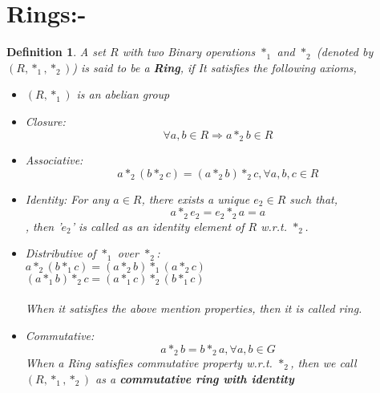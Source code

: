 \documentclass{article}
\newtheorem{defn}{Definition} [section]
\begin{document}
\section{Rings:-}
\begin{defn} A set $R$ with two Binary operations $*_1$ and $*_2$ (denoted by \textbf{$(R, *_1,*_2)$}) is said to be a \emph{\textbf{Ring}}, if
It satisfies the following axioms,\\
\begin{itemize}
    \item $(R,*_1)$ is an abelian group
	\item Closure: $$\forall a, b \in R \Rightarrow a*_2b \in R$$
	
	\item Associative: $$a*_2(b*_2c)=(a*_2b)*_2c, \forall a,b,c \in R$$
	
	\item Identity: For any $a \in R$, there exists a unique $e_2 \in R$ such that, $$a*_2e_2=e_2*_2a=a$$, then '$e_2$' is called as an identity element of $R$ w.r.t. $*_2$.
		\item Distributive of $*_1$ over $*_2$:\\
	$a*_2(b*_1c)=(a*_2b)*_1 (a*_2c)$\\
	$(a*_1b)*_2c=(a*_1c)*_2 (b*_1c)$\\
	\\ When it satisfies the above mention properties, then it is called ring.
	\item Commutative: $$a*_2b=b*_2a, \forall a,b \in G$$ When a Ring satisfies commutative property w.r.t. $*_2$, then we call $(R,*_1,*_2)$ as a \textbf{\emph{commutative ring with identity}}

\end{itemize}
\end{defn}
\end{document}
